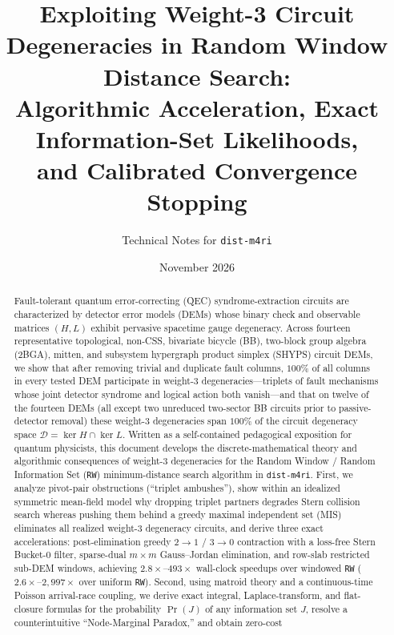 \documentclass[12pt]{article}
\theoremstyle{definition}
\newcommand{\Dc}{\mathcal{D}}
\newcommand{\ttt}[1]{\texttt{#1}}
\begin{document}
\title{Exploiting Weight-3 Circuit Degeneracies in Random Window Distance Search:\\
Algorithmic Acceleration, Exact Information-Set Likelihoods,\\
and Calibrated Convergence Stopping}
\author{Technical Notes for \ttt{dist-m4ri}}
\date{November 2026}
\maketitle

\begin{abstract}
Fault-tolerant quantum error-correcting (QEC) syndrome-extraction circuits are characterized by detector error
models (DEMs) whose binary check and observable matrices $(H, L)$ exhibit pervasive spacetime gauge degeneracy.
Across fourteen representative topological, non-CSS, bivariate bicycle (BB), two-block group algebra (2BGA),
mitten, and subsystem hypergraph product simplex (SHYPS) circuit DEMs, we show that after removing trivial and
duplicate fault columns, $100\%$ of all columns in every tested DEM participate in weight-3 degeneracies---triplets
of fault mechanisms whose joint detector syndrome and logical action both vanish---and that on twelve of the
fourteen DEMs (all except two unreduced two-sector BB circuits prior to passive-detector removal) these weight-3
degeneracies span $100\%$ of the circuit degeneracy space $\Dc = \ker H \cap \ker L$. Written as a self-contained
pedagogical exposition for quantum physicists, this document develops the discrete-mathematical theory and
algorithmic consequences of weight-3 degeneracies for the Random Window / Random Information Set (\ttt{RW})
minimum-distance search algorithm in \ttt{dist-m4ri}. First, we analyze pivot-pair obstructions (``triplet
ambushes''), show within an idealized symmetric mean-field model why dropping triplet partners degrades Stern
collision search whereas pushing them behind a greedy maximal independent set (MIS) eliminates all realized
weight-3 degeneracy circuits, and derive three exact accelerations: post-elimination greedy $2 \to 1$ / $3 \to 0$
contraction with a loss-free Stern Bucket-0 filter, sparse-dual $m \times m$ Gauss--Jordan elimination, and
row-slab restricted sub-DEM windows, achieving $2.8\times$--$493\times$ wall-clock speedups over windowed \ttt{RW}
($2.6\times$--$2{,}997\times$ over uniform \ttt{RW}). Second, using matroid theory and a continuous-time Poisson
arrival-race coupling, we derive exact integral, Laplace-transform, and flat-closure formulas for the probability
$\Pr(J)$ of any information set $J$, resolve a counterintuitive ``Node-Marginal Paradox,'' and obtain zero-cost

\end{abstract}
\end{document}

